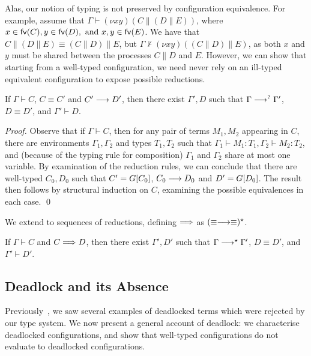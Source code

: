 \documentclass[oribibl,orivec,envcountsame]{llncs}
\begin{document}
Alas, our notion of typing is not preserved by configuration equivalence.  For example, assume that
$\Gamma \vdash (\nu x y)(C \parallel (D \parallel E))$, where $x \in \mathsf{fv}(C), y \in \mathsf{fv}(D), \text{
  and } x,y \in \mathsf{fv}(E)$.  We have that $C \parallel (D \parallel E) \equiv (C \parallel D) \parallel
E$, but $\Gamma \nvdash (\nu x y)((C \parallel D) \parallel E)$, as both $x$ and $y$ must be shared
between the processes $C \parallel D$ and $E$.  However, we can show that starting from a well-typed
configuration, we need never rely on an ill-typed equivalent configuration to expose possible
reductions.
%
\begin{theorem}\label{thm:preservation-equiv}
  If $\Gamma \vdash C$, $C \equiv C'$ and $C' \longrightarrow D'$, then there exist $\Gamma',D$ such that
  $\Gamma \longrightarrow^? \Gamma'$, $D \equiv D'$, and $\Gamma' \vdash D$.
\end{theorem}
%
\begin{proof}
  Observe that if $\Gamma \vdash C$, then for any pair of terms $M_1, M_2$ appearing in $C$, there
  are environments $\Gamma_1,\Gamma_2$ and types $T_1,T_2$ such that $\Gamma_1 \vdash M_1 :
  T_1,\Gamma_2 \vdash M_2 : T_2$, and (because of the typing rule for composition) $\Gamma_1$ and
  $\Gamma_2$ share at most one variable. By examination of the reduction rules, we can conclude that
  there are well-typed $C_0,D_0$ such that $C' = G[C_0]$, $C_0 \longrightarrow D_0$ and $D' = G[D_0]$.
  The result then follows by structural induction on $C$, examining the possible equivalences in
  each case. \qed
\end{proof}
%
We extend  to sequences of reductions, defining $\Longrightarrow$ as
$(\equiv\longrightarrow\equiv)^\star$.
%
\begin{corollary}
  If $\Gamma \vdash C$ and $C \Longrightarrow D$, then there exist $\Gamma',D'$ such that $\Gamma
  \longrightarrow^\star \Gamma'$, $D \equiv D'$, and $\Gamma' \vdash D'$.
\end{corollary}

\subsection{Deadlock and its Absence}\label{sec:gv-deadlock}
\newcommand{\blockedp}{\mathsf{blocked}}
\newcommand{\depp}{\mathsf{depends}}
\newcommand{\deadlockp}{\ensuremath{\mathsf{deadlocked}}}

Previously~, we saw several examples of deadlocked terms which were rejected by our
type system. We now present a general account of deadlock: we characterise deadlocked
configurations, and show that well-typed configurations do not evaluate to deadlocked
configurations.
\end{document}
